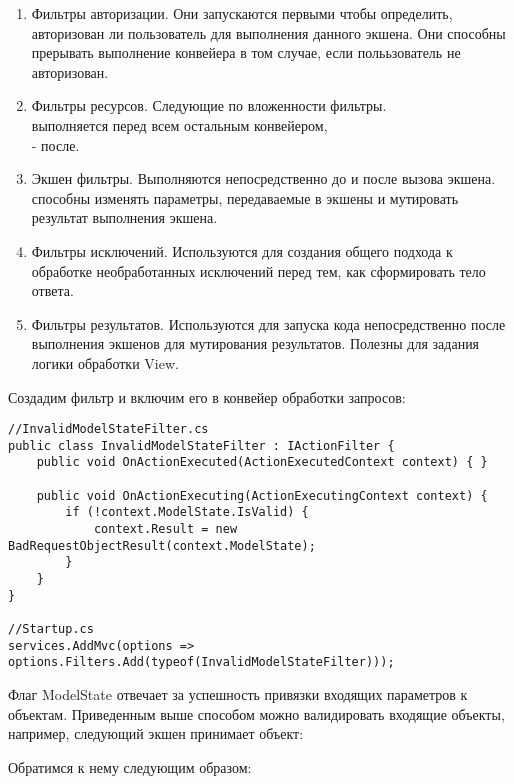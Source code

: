 \documentclass[a4paper,14pt]{extarticle}
\begin{document}
\begin{enumerate}
    \item Фильтры авторизации. Они запускаются первыми чтобы определить,
          авторизован ли пользователь для выполнения данного экшена. Они способны
          прерывать выполнение конвейера в том случае, если полььзователь не
          авторизован.
    \item Фильтры ресурсов. Следующие по вложенности фильтры.\\
           выполняется перед всем остальным
          конвейером,\\ - после.
    \item Экшен фильтры. Выполняются непосредственно до и после вызова экшена.
          способны изменять параметры, передаваемые в экшены и мутировать
          результат выполнения экшена.
    \item Фильтры исключений. Используются для создания общего подхода к обработке
          необработанных исключений перед тем, как сформировать тело ответа.
    \item Фильтры результатов. Используются для запуска кода непосредственно после
          выполнения экшенов для мутирования результатов. Полезны для задания логики
          обработки View.
\end{enumerate}

Создадим фильтр и включим его в конвейер обработки запросов:

\begin{lstlisting}
//InvalidModelStateFilter.cs
public class InvalidModelStateFilter : IActionFilter {
    public void OnActionExecuted(ActionExecutedContext context) { }

    public void OnActionExecuting(ActionExecutingContext context) {
        if (!context.ModelState.IsValid) {
            context.Result = new BadRequestObjectResult(context.ModelState);
        }
    }
}

//Startup.cs
services.AddMvc(options => options.Filters.Add(typeof(InvalidModelStateFilter)));
\end{lstlisting}

Флаг ModelState отвечает за успешность привязки входящих параметров к объектам.
Приведенным выше способом можно валидировать входящие объекты, например, следующий
экшен принимает объект:


Обратимся к нему следующим образом:
\end{document}
